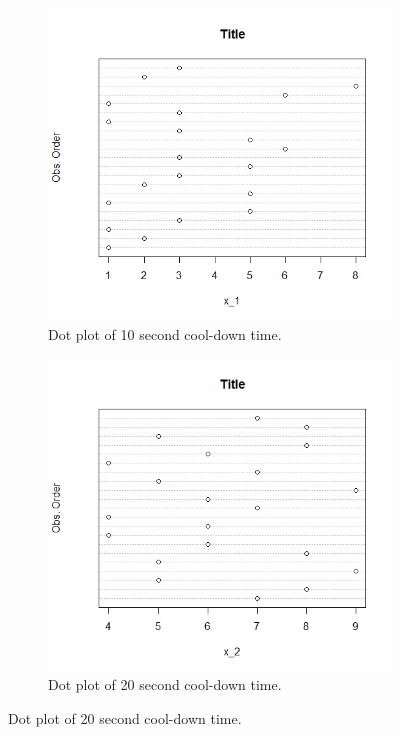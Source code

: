 \documentclass{article}
\begin{document}
  \begin{figure}[h]
    \centering
    \begin{subfigure}[b]{0.4\textwidth}
        \includegraphics[width=1.25\textwidth]{./hw_1/images/dot_1.png}
        \caption{Dot plot of 10 second cool-down time.}
      \label{fig:img1}
    \end{subfigure}
    \hfill
    \begin{subfigure}[b]{0.4\textwidth}
        \includegraphics[width=1.25\textwidth]{./hw_1/images/dot_2.png}
        \caption{Dot plot of 20 second cool-down time.}
      \label{fig:img2}
    \end{subfigure}
    \label{fig:both}
  \end{figure}
\end{document}
